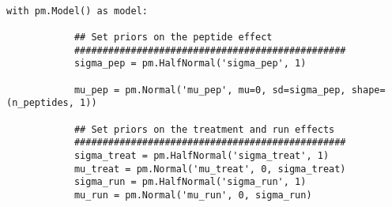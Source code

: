 \documentclass[a4paper]{article}
\begin{document}
\renewcommand{\theFancyVerbLine}{
  \sffamily\textcolor[rgb]{0.5,0.5,0.5}{\scriptsize\arabic{FancyVerbLine}}}


            
\begin{verbatim}

with pm.Model() as model:
               
            ## Set priors on the peptide effect
            ################################################
            sigma_pep = pm.HalfNormal('sigma_pep', 1)
    
            mu_pep = pm.Normal('mu_pep', mu=0, sd=sigma_pep, shape=(n_peptides, 1))       
    
            ## Set priors on the treatment and run effects
            ################################################    
            sigma_treat = pm.HalfNormal('sigma_treat', 1)
            mu_treat = pm.Normal('mu_treat', 0, sigma_treat)
            sigma_run = pm.HalfNormal('sigma_run', 1)
            mu_run = pm.Normal('mu_run', 0, sigma_run)
\end{verbatim}       
            
\newpage
            
\end{document}
